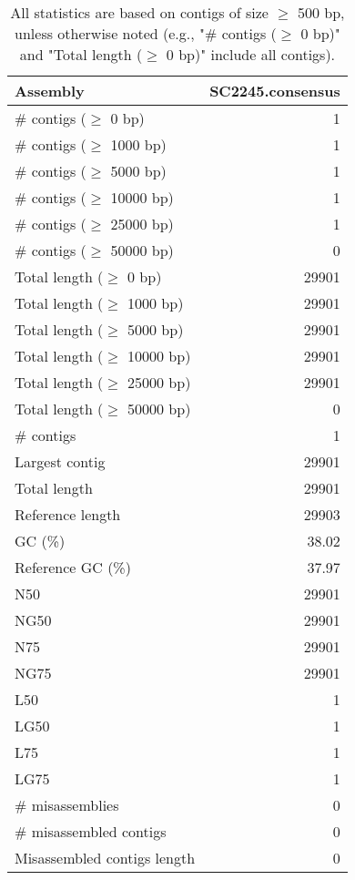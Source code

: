 \documentclass[12pt,a4paper]{article}
\begin{document}
\begin{table}[ht]
\begin{center}
\caption{All statistics are based on contigs of size $\geq$ 500 bp, unless otherwise noted (e.g., "\# contigs ($\geq$ 0 bp)" and "Total length ($\geq$ 0 bp)" include all contigs).}
\begin{tabular}{|l*{1}{|r}|}
\hline
Assembly & SC2245.consensus \\ \hline
\# contigs ($\geq$ 0 bp) & 1 \\ \hline
\# contigs ($\geq$ 1000 bp) & 1 \\ \hline
\# contigs ($\geq$ 5000 bp) & 1 \\ \hline
\# contigs ($\geq$ 10000 bp) & 1 \\ \hline
\# contigs ($\geq$ 25000 bp) & 1 \\ \hline
\# contigs ($\geq$ 50000 bp) & 0 \\ \hline
Total length ($\geq$ 0 bp) & 29901 \\ \hline
Total length ($\geq$ 1000 bp) & 29901 \\ \hline
Total length ($\geq$ 5000 bp) & 29901 \\ \hline
Total length ($\geq$ 10000 bp) & 29901 \\ \hline
Total length ($\geq$ 25000 bp) & 29901 \\ \hline
Total length ($\geq$ 50000 bp) & 0 \\ \hline
\# contigs & 1 \\ \hline
Largest contig & 29901 \\ \hline
Total length & 29901 \\ \hline
Reference length & 29903 \\ \hline
GC (\%) & 38.02 \\ \hline
Reference GC (\%) & 37.97 \\ \hline
N50 & 29901 \\ \hline
NG50 & 29901 \\ \hline
N75 & 29901 \\ \hline
NG75 & 29901 \\ \hline
L50 & 1 \\ \hline
LG50 & 1 \\ \hline
L75 & 1 \\ \hline
LG75 & 1 \\ \hline
\# misassemblies & 0 \\ \hline
\# misassembled contigs & 0 \\ \hline
Misassembled contigs length & 0 \\ \hline

\end{tabular}
\end{center}
\end{table}
\end{document}
